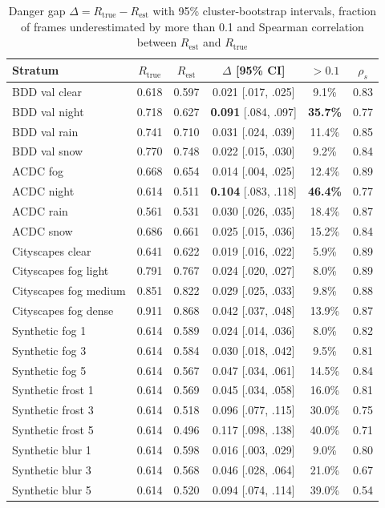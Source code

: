 \documentclass[pdflatex,sn-mathphys-num]{sn-jnl}
\newcommand{\Rtrue}{R_{\mathrm{true}}}
\newcommand{\Rest}{R_{\mathrm{est}}}
\begin{document}
\begin{table}[t]
\caption{Danger gap $\Delta = \Rtrue - \Rest$ with 95\% cluster-bootstrap intervals, fraction of frames underestimated by more than 0.1 and Spearman correlation between $\Rest$ and $\Rtrue$}
\label{tab:danger}
\footnotesize
\setlength{\tabcolsep}{4pt}
\begin{tabular}{@{}lccccc@{}}
\toprule
Stratum & $\Rtrue$ & $\Rest$ & $\Delta$ [95\% CI] & $>0.1$ & $\rho_s$ \\
\midrule
BDD val clear & 0.618 & 0.597 & 0.021 [.017, .025] & 9.1\% & 0.83 \\
BDD val night & 0.718 & 0.627 & \textbf{0.091} [.084, .097] & \textbf{35.7\%} & 0.77 \\
BDD val rain & 0.741 & 0.710 & 0.031 [.024, .039] & 11.4\% & 0.85 \\
BDD val snow & 0.770 & 0.748 & 0.022 [.015, .030] & 9.2\% & 0.84 \\
ACDC fog & 0.668 & 0.654 & 0.014 [.004, .025] & 12.4\% & 0.89 \\
ACDC night & 0.614 & 0.511 & \textbf{0.104} [.083, .118] & \textbf{46.4\%} & 0.77 \\
ACDC rain & 0.561 & 0.531 & 0.030 [.026, .035] & 18.4\% & 0.87 \\
ACDC snow & 0.686 & 0.661 & 0.025 [.015, .036] & 15.2\% & 0.84 \\
Cityscapes clear & 0.641 & 0.622 & 0.019 [.016, .022] & 5.9\% & 0.89 \\
Cityscapes fog light & 0.791 & 0.767 & 0.024 [.020, .027] & 8.0\% & 0.89 \\
Cityscapes fog medium & 0.851 & 0.822 & 0.029 [.025, .033] & 9.8\% & 0.88 \\
Cityscapes fog dense & 0.911 & 0.868 & 0.042 [.037, .048] & 13.9\% & 0.87 \\
Synthetic fog 1 & 0.614 & 0.589 & 0.024 [.014, .036] & 8.0\% & 0.82 \\
Synthetic fog 3 & 0.614 & 0.584 & 0.030 [.018, .042] & 9.5\% & 0.81 \\
Synthetic fog 5 & 0.614 & 0.567 & 0.047 [.034, .061] & 14.5\% & 0.84 \\
Synthetic frost 1 & 0.614 & 0.569 & 0.045 [.034, .058] & 16.0\% & 0.81 \\
Synthetic frost 3 & 0.614 & 0.518 & 0.096 [.077, .115] & 30.0\% & 0.75 \\
Synthetic frost 5 & 0.614 & 0.496 & 0.117 [.098, .138] & 40.0\% & 0.71 \\
Synthetic blur 1 & 0.614 & 0.598 & 0.016 [.003, .029] & 9.0\% & 0.80 \\
Synthetic blur 3 & 0.614 & 0.568 & 0.046 [.028, .064] & 21.0\% & 0.67 \\
Synthetic blur 5 & 0.614 & 0.520 & 0.094 [.074, .114] & 39.0\% & 0.54 \\
\bottomrule
\end{tabular}
\end{table}
\end{document}
